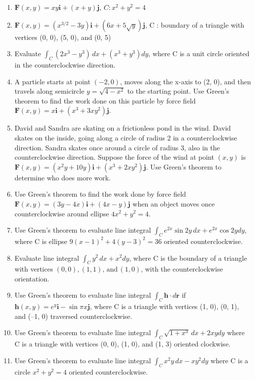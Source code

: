 \documentclass{exercises}
\begin{document}
\begin{enumerate}[resume]
\item $\mathbf{F}(x,y)=xy\mathbf{i}+(x+y)\mathbf{j}$, $C:x^{2}+y^{2}=4$
\item $\mathbf{F}(x,y)=(x^{3/2}-3y)\mathbf{i}+(6x+5\sqrt{y})\mathbf{j}$, C : boundary of a triangle with vertices (0, 0), (5, 0), and (0, 5)
\item Evaluate $\int_{C}(2x^{3}-y^{3})\,dx+(x^{3}+y^{3})dy$, where C is a unit circle oriented in the counterclockwise direction.
\item A particle starts at point $(-2,0)$, moves along the x-axis to (2, 0), and then travels along semicircle $y=\sqrt{4-x^{2}}$ to the starting point. Use Green's theorem to find the work done on this particle by force field $\mathbf{F}(x,y)=x\mathbf{i}+(x^{3}+3xy^{2})\mathbf{j}$.
\item David and Sandra are skating on a frictionless pond in the wind. David skates on the inside, going along a circle of radius 2 in a counterclockwise direction. Sandra skates once around a circle of radius 3, also in the counterclockwise direction. Suppose the force of the wind at point $(x,y)$ is $\mathbf{F}(x,y)=(x^{2}y+10y)\mathbf{i}+(x^{3}+2xy^{2})\mathbf{j}$. Use Green's theorem to determine who does more work.
\item Use Green's theorem to find the work done by force field $\mathbf{F}(x,y)=(3y-4x)\mathbf{i}+(4x-y)\mathbf{j}$ when an object moves once counterclockwise around ellipse $4x^{2}+y^{2}=4$.
\item Use Green's theorem to evaluate line integral $\int_{C}e^{2x}\sin 2y\,dx+e^{2x}\cos 2ydy$, where C is ellipse $9{(x-1)}^{2}+4{(y-3)}^{2}=36$ oriented counterclockwise.
\item Evaluate line integral $\int_{C}y^{2}\,dx+x^{2}dy$, where C is the boundary of a triangle with vertices $(0,0),(1,1),\,\text{and}\,(1,0)$, with the counterclockwise orientation.
\item Use Green's theorem to evaluate line integral $\int_{C}\mathbf{h}\cdot d\mathbf{r}$ if $\mathbf{h}(x,y)=e^{y}\mathbf{i}-\sin \pi x\mathbf{j}$, where C is a triangle with vertices (1, 0), (0, 1), and (--1, 0) traversed counterclockwise.
\item Use Green's theorem to evaluate line integral $\int_{C}^{}\sqrt{1+x^{3}}\,dx+2xydy$ where C is a triangle with vertices (0, 0), (1, 0), and (1, 3) oriented clockwise.
\item Use Green's theorem to evaluate line integral $\int_{C}^{}x^{2}y\,dx-xy^{2}dy$ where C is a circle $x^{2}+y^{2}=4$ oriented counterclockwise.

\end{enumerate}
\end{document}
